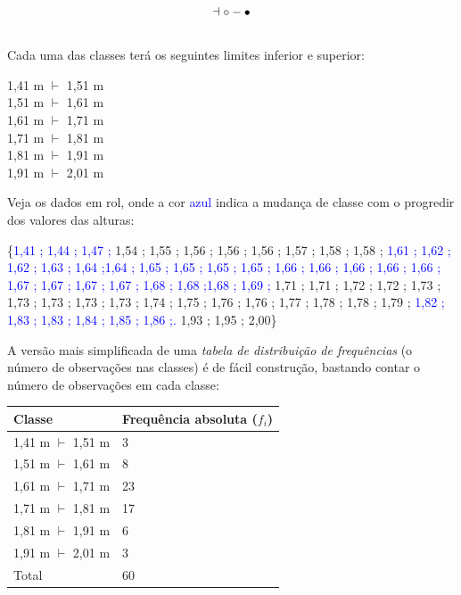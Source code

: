 \documentclass[
]{book}
\begin{document}
\hfill\break

\[
\dashv  \\
{\circ}-{\bullet}
\]\\

Cada uma das classes terá os seguintes limites inferior e superior:

\hfill\break

1,41 m \(\vdash\) 1,51 m\\
1,51 m \(\vdash\) 1,61 m\\
1,61 m \(\vdash\) 1,71 m\\
1,71 m \(\vdash\) 1,81 m\\
1,81 m \(\vdash\) 1,91 m\\
1,91 m \(\vdash\) 2,01 m

\hfill\break

Veja os dados em rol, onde a cor \textcolor{blue}{azul} indica a mudança de classe com o progredir dos valores das alturas:

\hfill\break

\{\textcolor{blue}{1,41 ; 1,44 ; 1,47 ;} 1,54 ; 1,55 ; 1,56 ; 1,56 ; 1,56 ; 1,57 ; 1,58 ; 1,58 ; \textcolor{blue}{1,61 ; 1,62 ; 1,62 ; 1,63 ; 1,64 ;1,64 ; 1,65 ; 1,65 ; 1,65 ; 1,65 ; 1,66 ; 1,66 ; 1,66 ; 1,66 ; 1,66 ; 1,67 ; 1,67 ; 1,67 ; 1,67 ; 1,68 ; 1,68 ;1,68 ; 1,69 ;} 1,71 ; 1,71 ; 1,72 ; 1,72 ; 1,73 ; 1,73 ; 1,73 ; 1,73 ; 1,73 ; 1,74 ; 1,75 ; 1,76 ; 1,76 ; 1,77 ; 1,78 ; 1,78 ; 1,79 ; \textcolor{blue}{1,82 ; 1,83 ; 1,83 ; 1,84 ; 1,85 ; 1,86 ;.} 1,93 ; 1,95 ; 2,00\}

\hfill\break

A versão mais simplificada de uma \emph{tabela de distribuição de frequências} (o número de observações nas classes) é de fácil construção, bastando contar o número de observações em cada classe:

\hfill\break

\begin{longtable}[]{@{}ll@{}}
\toprule()
Classe & Frequência absoluta (\(f_{i}\)) \\
\midrule()
\endhead
1,41 m \(\vdash\) 1,51 m & 3 \\
1,51 m \(\vdash\) 1,61 m & 8 \\
1,61 m \(\vdash\) 1,71 m & 23 \\
1,71 m \(\vdash\) 1,81 m & 17 \\
1,81 m \(\vdash\) 1,91 m & 6 \\
1,91 m \(\vdash\) 2,01 m & 3 \\
Total & 60 \\
\bottomrule()
\end{longtable}
\end{document}
